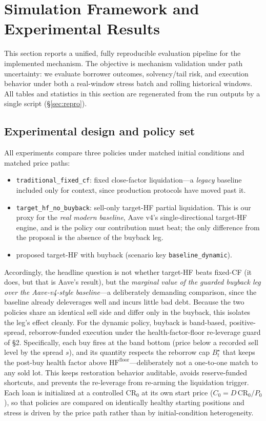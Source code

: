 \documentclass[12pt]{article}
\begin{document}
\section{Simulation Framework and Experimental Results}
\label{sec:results}
This section reports a unified, fully reproducible evaluation pipeline for the implemented mechanism. The objective is mechanism validation under path uncertainty: we evaluate borrower outcomes, solvency/tail risk, and execution behavior under both a real-window stress batch and rolling historical windows. All tables and statistics in this section are regenerated from the run outputs by a single script (\S\ref{sec:repro}).

\subsection{Experimental design and policy set}
All experiments compare three policies under matched initial conditions and matched price paths:
\begin{itemize}
  \item \texttt{traditional\_fixed\_cf}: fixed close-factor liquidation---a \emph{legacy} baseline included only for context, since production protocols have moved past it.
  \item \texttt{target\_hf\_no\_buyback}: sell-only target-HF partial liquidation. This is our proxy for the \emph{real modern baseline}, Aave v4's single-directional target-HF engine, and is the policy our contribution must beat; the only difference from the proposal is the absence of the buyback leg.
  \item proposed target-HF with buyback (scenario key \texttt{baseline\_dynamic}).
\end{itemize}
Accordingly, the headline question is not whether target-HF beats fixed-CF (it does, but that is Aave's result), but the \emph{marginal value of the guarded buyback leg over the Aave-v4-style baseline}---a deliberately demanding comparison, since the baseline already deleverages well and incurs little bad debt. Because the two policies share an identical sell side and differ only in the buyback, this isolates the leg's effect cleanly.
For the dynamic policy, buyback is band-based, positive-spread, reborrow-funded execution under the health-factor-floor re-leverage guard of \S2. Specifically, each buy fires at the band bottom (price below a recorded sell level by the spread $s$), and its quantity respects the reborrow cap $B_t^{\star}$ that keeps the post-buy health factor above $\mathrm{HF}^{\text{floor}}$---deliberately not a one-to-one match to any sold lot. This keeps restoration behavior auditable, avoids reserve-funded shortcuts, and prevents the re-leverage from re-arming the liquidation trigger. Each loan is initialized at a controlled $\mathrm{CR}_0$ at its own start price ($C_0=D\,\mathrm{CR}_0/P_0$), so that policies are compared on identically healthy starting positions and stress is driven by the price path rather than by initial-condition heterogeneity.
\end{document}
